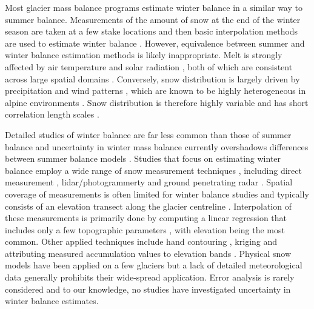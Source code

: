 \documentclass[review,oneside, letterpaper]{igs}
\begin{document}
Most glacier mass balance programs estimate winter balance in a similar way to summer balance. Measurements of the amount of snow at the end of the winter season are taken at a few stake locations and then basic interpolation methods are used to estimate winter balance \citep[e.g.][]{Hock1999, Thibert2008, MacDougall2011, Cullen2017}. However, equivalence between summer and winter balance estimation methods is likely inappropriate. Melt is strongly affected by air temperature and solar radiation \citep{Hock2005}, both of which are consistent across large spatial domains \citep{Barry1992}. Conversely, snow distribution is largely driven by precipitation \citep{Lehning2008} and wind patterns \citep{Bernhardt2009, Musselman2015}, which are known to be highly heterogeneous in alpine environments \citep{Barry1992}. Snow distribution is therefore highly variable and has short correlation length scales \citep[e.g.][]{Anderton2004, Egli2011, Grunewald2010, Helbig2017, Lopez2011, Lopez2013, Machguth2006, Marshall2006}. 

Detailed studies of winter balance are far less common than those of summer balance and uncertainty in winter mass balance currently overshadows differences between summer balance models \citep{Reveillet2016}. Studies that focus on estimating winter balance  employ a wide range of snow measurement techniques \citep{Sold2013}, including direct measurement \citep[e.g.][]{Cullen2017}, lidar/photogrammerty \citep[e.g.][]{Sold2013} and ground penetrating radar \citep[e.g.][]{Machguth2006, Gusmeroli2014, McGrath2015}. Spatial coverage of measurements is often limited for winter balance studies and typically consists of an elevation transect along the glacier centreline \citep[e.g.][]{Kaser2003, Machguth2006}. Interpolation of these measurements is primarily done by computing a linear regression that includes only a few topographic parameters \citep[e.g.][]{MacDougall2011}, with elevation being the most common. Other applied techniques include hand contouring \citep[e.g.][]{Tangborn1975}, kriging \citep[e.g.][]{Hock1999} and attributing measured accumulation values to elevation bands \citep[e.g.][]{Thibert2008}. Physical snow models have been applied on a few glaciers \citep{Mott2008, Dadic2010} but a lack of detailed meteorological data generally prohibits their wide-spread application. Error analysis is rarely considered and to our knowledge, no studies have investigated uncertainty in winter balance estimates. 
\end{document}
